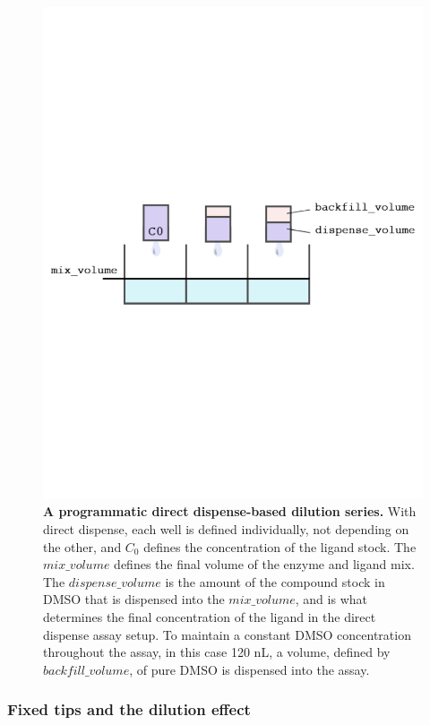 \documentclass[aps,pre,twocolumn,nofootinbib,superscriptaddress,linenumbers]{revtex4-1}
\begin{document}
\begin{figure}[tb]
    \includegraphics[trim={0 9cm 0 9cm},clip,width=\columnwidth]{../figures/direct_dispense.pdf}

  \caption{{\bf A programmatic direct dispense-based dilution series.}
  With direct dispense, each well is defined individually, not depending on the other, and $C_0$ defines the concentration of the ligand stock. 
  The $mix\_volume$ defines the final volume of the enzyme and ligand mix. 
  The $dispense\_volume$ is the amount of the compound stock in DMSO that is dispensed into the $mix\_volume$, and is what determines the final concentration of the ligand in the direct dispense assay setup. 
  To maintain a constant DMSO concentration throughout the assay, in this case 120 nL, a volume, defined by $backfill\_volume$, of pure DMSO is dispensed into the assay.
  }
  \label{fig:direct_dispense}
\end{figure}

\subsubsection*{Fixed tips and the dilution effect}
\end{document}
